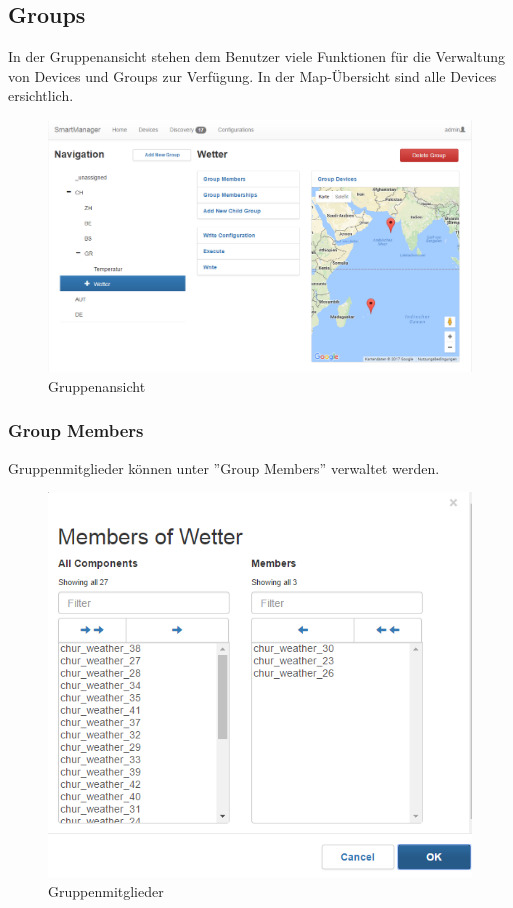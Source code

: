 \subsection{Groups}
In der Gruppenansicht stehen dem Benutzer viele Funktionen für die Verwaltung von Devices und Groups zur Verfügung. In der Map-Übersicht sind alle Devices ersichtlich.

\begin{figure}[H]
\centering
\includegraphics[scale=0.57]{../04_Realisierung/images/userinterface/groups.png}
\caption{Gruppenansicht}
\end{figure}
\newpage

\subsubsection{Group Members}
Gruppenmitglieder können unter ''Group Members'' verwaltet werden. 

\begin{figure}[H]
\centering
\includegraphics[scale=0.8]{../04_Realisierung/images/userinterface/groupmembers.png}
\caption{Gruppenmitglieder}
\end{figure}

